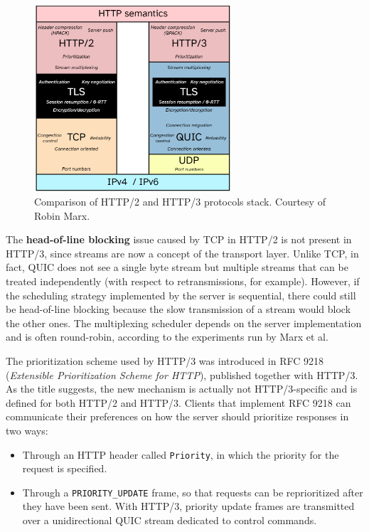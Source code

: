 \begin{figure}
    \centering
    \includegraphics[width=0.65\textwidth]{res/protocol-stack-h2-h3-improved-readability.png}
    \caption{Comparison of HTTP/2 and HTTP/3 protocols stack. Courtesy of Robin Marx.\protect\footnotemark}
    \label{fig:my_label}
\end{figure}


The \textbf{head-of-line blocking} issue caused by TCP in HTTP/2 is not present in HTTP/3, since streams are now a concept of the transport layer. Unlike TCP, in fact, QUIC does not see a single byte stream but multiple streams that can be treated independently (with respect to retransmissions, for example). However, if the scheduling strategy implemented by the server is sequential, there could still be head-of-line blocking because the slow transmission of a stream would block the other ones. The multiplexing scheduler depends on the server implementation and is often round-robin, according to the experiments run by Marx et al.\cite{quicdiversity}

The prioritization scheme used by HTTP/3 was introduced in RFC 9218 (\textit{Extensible Prioritization Scheme for HTTP}), published together with HTTP/3. As the title suggests, the new mechanism is actually not HTTP/3-specific and is defined for both HTTP/2 and HTTP/3. Clients that implement RFC 9218 can communicate their preferences on how the server should prioritize responses in two ways:\cite{rfc9218}

\begin{itemize}
    \item Through an HTTP header called \texttt{Priority}, in which the priority for the request is specified.
    \item Through a \texttt{PRIORITY\_UPDATE} frame, so that requests can be reprioritized after they have been sent. With HTTP/3, priority update frames are transmitted over a unidirectional QUIC stream dedicated to control commands.
\end{itemize}

